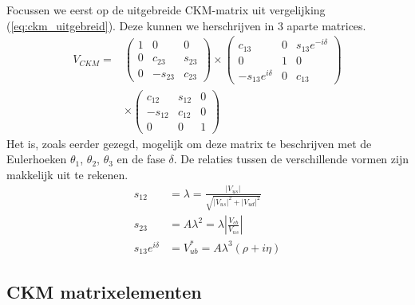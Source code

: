 \documentclass[../main.tex]{subfiles}
\begin{document}
Focussen we eerst op de uitgebreide CKM-matrix uit vergelijking (\ref{eq:ckm_uitgebreid}). Deze kunnen we herschrijven in 3 aparte matrices.
\begin{equation}
    \begin{aligned}
        \label{eq:ckm_uitgebreid_split}
        V_{C K M}=&\left(\begin{array}{ccc}
                1 & 0 & 0 \\
                0 & c_{23} & s_{23} \\
                0 & -s_{23} & c_{23}
            \end{array}\right) \times\left(\begin{array}{ccc}
                c_{13} & 0 & s_{13} e^{-i \delta} \\
                0 & 1 & 0 \\
                -s_{13} e^{i \delta} & 0 & c_{13}
            \end{array}\right) \\
            & \times\left(\begin{array}{ccc}
                c_{12} & s_{12} & 0 \\
                -s_{12} & c_{12} & 0 \\
                0 & 0 & 1
        \end{array}\right)
    \end{aligned}
\end{equation}
Het is, zoals eerder gezegd, mogelijk om deze matrix te beschrijven met de Eulerhoeken $\theta_1$, $\theta_2$, $\theta_3$ en de fase $\delta$. De relaties tussen de verschillende vormen zijn makkelijk uit te rekenen.
\begin{equation}
    \begin{aligned}
        \label{eq:ckm_relaties}
        s_{12} &=\lambda=\frac{\left|V_{u s}\right|}{\sqrt{\left|V_{u s}\right|^{2}+\left|V_{u d}\right|^{2}}} \\
        s_{23} &=A \lambda^{2}=\lambda\left|\frac{V_{c b}}{V_{u s}}\right| \\
        s_{13} e^{i \delta} &=V_{u b}^{*}=A \lambda^{3}(\rho+i \eta)
    \end{aligned}
\end{equation}

\subsection{CKM matrixelementen}%
\label{sub:ckm_matrix_elementen}
\end{document}
